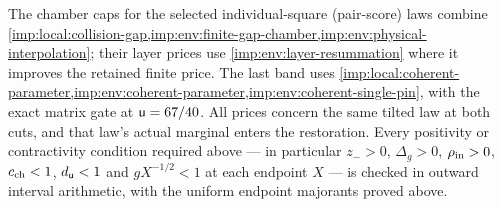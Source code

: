 \begin{certificate}\label{cert:positive-root-caps}
The chamber caps for the selected individual-square (pair-score) laws combine
\cref{imp:local:collision-gap,imp:env:finite-gap-chamber,imp:env:physical-interpolation};
their layer prices use \cref{imp:env:layer-resummation} where it improves the
retained finite price. The last band uses
\cref{imp:local:coherent-parameter,imp:env:coherent-parameter,imp:env:coherent-single-pin},
with the exact matrix gate at $\mathsf u=67/40$.
All prices concern the same tilted law at both cuts, and that law's
actual marginal enters the restoration. Every positivity or
contractivity condition required above --- in particular
$z_->0$, $\Delta_g>0$, $\rho_{\rm in}>0$, $c_{\rm ch}<1$,
$d_\mathsf u<1$ and $gX^{-1/2}<1$ at each endpoint $X$ --- is checked
in outward interval arithmetic, with the uniform endpoint
majorants proved above.


\end{certificate}
